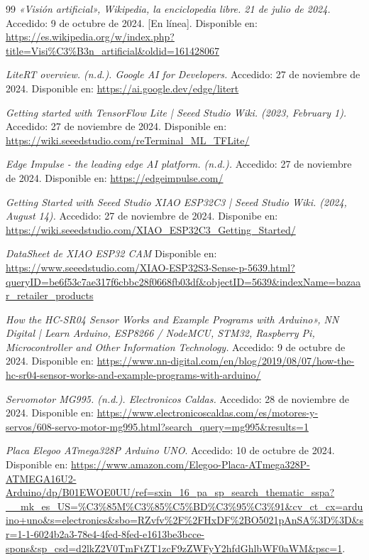 \begin{thebibliography}{99}
    \textit{«Visión artificial», Wikipedia, la enciclopedia libre. 21 de julio de 2024.} Accedido: 9 de octubre de 2024. [En línea]. Disponible en: \url{https://es.wikipedia.org/w/index.php?title=Visi%C3%B3n_artificial&oldid=161428067}
    
    \textit{LiteRT overview. (n.d.). Google AI for Developers.} Accedido: 27 de noviembre de 2024. Disponible en: \url{https://ai.google.dev/edge/litert}
    
    \textit{Getting started with TensorFlow Lite | Seeed Studio Wiki. (2023, February 1).} Accedido: 27 de noviembre de 2024. Disponible en: \url{https://wiki.seeedstudio.com/reTerminal_ML_TFLite/}
    
    \textit{Edge Impulse - the leading edge AI platform. (n.d.).} Accedido: 27 de noviembre de 2024. Disponible en: \url{https://edgeimpulse.com/}
  
    \textit{Getting Started with Seeed Studio XIAO ESP32C3 | Seeed Studio Wiki. (2024, August 14).} Accedido: 27 de noviembre de 2024. Disponibe en: \url{ https://wiki.seeedstudio.com/XIAO_ESP32C3_Getting_Started/}
    
    \textit{DataSheet de XIAO ESP32 CAM} Disponible en: \url{https://www.seeedstudio.com/XIAO-ESP32S3-Sense-p-5639.html?queryID=be6f53c7ae317f6cbbc28f0668fb03df&objectID=5639&indexName=bazaar_retailer_products}
            
    \textit{How the HC-SR04 Sensor Works and Example Programs with Arduino», NN Digital | Learn Arduino, ESP8266 / NodeMCU, STM32, Raspberry Pi, Microcontroller and Other Information Technology.} Accedido: 9 de octubre de 2024. Disponible en: \url{https://www.nn-digital.com/en/blog/2019/08/07/how-the-hc-sr04-sensor-works-and-example-programs-with-arduino/}

    \textit{Servomotor MG995. (n.d.). Electronicos Caldas.} Accedido: 28 de noviembre de 2024. Disponible en: \url{https://www.electronicoscaldas.com/es/motores-y-servos/608-servo-motor-mg995.html?search_query=mg995&results=1}

    \textit{Placa Elegoo ATmega328P Arduino UNO}. Accedido: 10 de octubre de 2024. Disponible en: \url{https://www.amazon.com/Elegoo-Placa-ATmega328P-ATMEGA16U2-Arduino/dp/B01EWOE0UU/ref=sxin_16_pa_sp_search_thematic_sspa?__mk_es_US=%C3%85M%C3%85%C5%BD%C3%95%C3%91&cv_ct_cx=arduino+uno&s=electronics&sbo=RZvfv%2F%2FHxDF%2BO5021pAnSA%3D%3D&sr=1-1-6024b2a3-78e4-4fed-8fed-e1613be3bcce-spons&sp_csd=d2lkZ2V0TmFtZT1zcF9zZWFyY2hfdGhlbWF0aWM&psc=1}.
    

\end{thebibliography}
